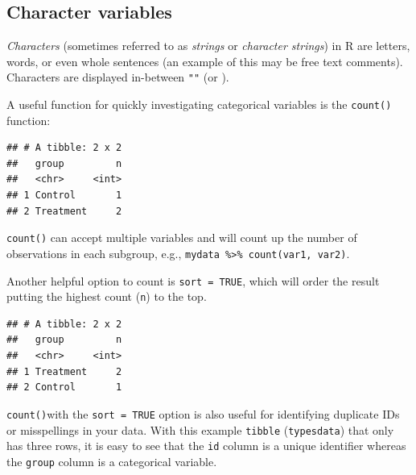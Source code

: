 \documentclass[
  12pt,
  krantz2]{krantz}
\makeatletter
\newenvironment{Shaded}{\begin{snugshade}}{\end{snugshade}}
\newcommand{\DataTypeTok}[1]{\textcolor[rgb]{0.13,0.29,0.53}{#1}}
\newcommand{\KeywordTok}[1]{\textcolor[rgb]{0.13,0.29,0.53}{\textbf{#1}}}
\newcommand{\NormalTok}[1]{#1}
\newcommand{\OperatorTok}[1]{\textcolor[rgb]{0.81,0.36,0.00}{\textbf{#1}}}
\newcommand{\OtherTok}[1]{\textcolor[rgb]{0.56,0.35,0.01}{#1}}
\newcommand{\StringTok}[1]{\textcolor[rgb]{0.31,0.60,0.02}{#1}}
\newenvironment{kframe}{%
\medskip{}
\setlength{\fboxsep}{.8em}
 \def\at@end@of@kframe{}%
 \ifinner\ifhmode%
  \def\at@end@of@kframe{\end{minipage}}%
  \begin{minipage}{\columnwidth}%
 \fi\fi%
 \def\FrameCommand##1{\hskip\@totalleftmargin \hskip-\fboxsep
 \colorbox{shadecolor}{##1}\hskip-\fboxsep
     \hskip-\linewidth \hskip-\@totalleftmargin \hskip\columnwidth}%
 \MakeFramed {\advance\hsize-\width
   \@totalleftmargin\z@ \linewidth\hsize
   \@setminipage}}%
 {\par\unskip\endMakeFramed%
 \at@end@of@kframe}
\renewenvironment{Shaded}{\begin{kframe}}{\end{kframe}}
\makeatother
\begin{document}
\hypertarget{character-variables}{%
\subsection{Character variables}\label{character-variables}}


\emph{Characters} (sometimes referred to as \emph{strings} or \emph{character strings}) in R are letters, words, or even whole sentences (an example of this may be free text comments).
Characters are displayed in-between \texttt{""} (or \texttt{\textquotesingle{}\textquotesingle{}}).

A useful function for quickly investigating categorical variables is the \texttt{count()} function:

\begin{Shaded}
\end{Shaded}

\begin{verbatim}
## # A tibble: 2 x 2
##   group         n
##   <chr>     <int>
## 1 Control       1
## 2 Treatment     2
\end{verbatim}

\texttt{count()} can accept multiple variables and will count up the number of observations in each subgroup, e.g., \texttt{mydata\ \%\textgreater{}\%\ count(var1,\ var2)}.

Another helpful option to count is \texttt{sort\ =\ TRUE}, which will order the result putting the highest count (\texttt{n}) to the top.

\begin{Shaded}
\end{Shaded}

\begin{verbatim}
## # A tibble: 2 x 2
##   group         n
##   <chr>     <int>
## 1 Treatment     2
## 2 Control       1
\end{verbatim}

\texttt{count()}with the \texttt{sort\ =\ TRUE} option is also useful for identifying duplicate IDs or misspellings in your data.
With this example \texttt{tibble} (\texttt{typesdata}) that only has three rows, it is easy to see that the \texttt{id} column is a unique identifier whereas the \texttt{group} column is a categorical variable.
\end{document}
